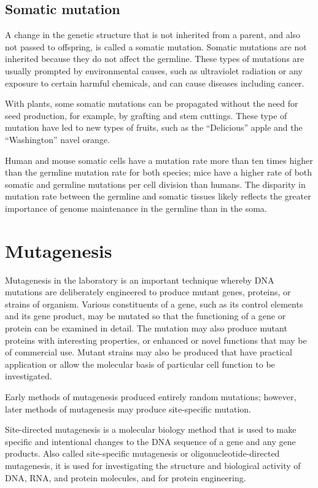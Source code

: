 \hypertarget{somatic-mutation}{%
\subsection{Somatic mutation}\label{somatic-mutation}}

A change in the genetic structure that is not inherited from a parent, and also not passed to offspring, is called a somatic mutation. Somatic mutations are not inherited because they do not affect the germline. These types of mutations are usually prompted by environmental causes, such as ultraviolet radiation or any exposure to certain harmful chemicals, and can cause diseases including cancer.

With plants, some somatic mutations can be propagated without the need for seed production, for example, by grafting and stem cuttings. These type of mutation have led to new types of fruits, such as the ``Delicious'' apple and the ``Washington'' navel orange.

Human and mouse somatic cells have a mutation rate more than ten times higher than the germline mutation rate for both species; mice have a higher rate of both somatic and germline mutations per cell division than humans. The disparity in mutation rate between the germline and somatic tissues likely reflects the greater importance of genome maintenance in the germline than in the soma.

\hypertarget{mutagenesis}{%
\section{Mutagenesis}\label{mutagenesis}}

Mutagenesis in the laboratory is an important technique whereby DNA mutations are deliberately engineered to produce mutant genes, proteins, or strains of organism. Various constituents of a gene, such as its control elements and its gene product, may be mutated so that the functioning of a gene or protein can be examined in detail. The mutation may also produce mutant proteins with interesting properties, or enhanced or novel functions that may be of commercial use. Mutant strains may also be produced that have practical application or allow the molecular basis of particular cell function to be investigated.

Early methods of mutagenesis produced entirely random mutations; however, later methods of mutagenesis may produce site-specific mutation.

Site-directed mutagenesis is a molecular biology method that is used to make specific and intentional changes to the DNA sequence of a gene and any gene products. Also called site-specific mutagenesis or oligonucleotide-directed mutagenesis, it is used for investigating the structure and biological activity of DNA, RNA, and protein molecules, and for protein engineering.

